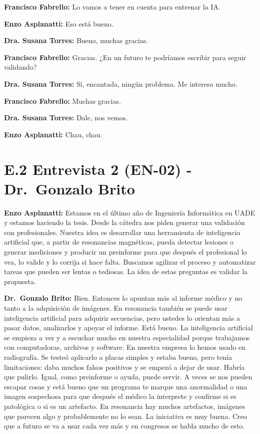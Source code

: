 \noindent\textbf{Francisco Fabrello:} Lo vamos a tener en cuenta para entrenar la IA.

\noindent\textbf{Enzo Asplanatti:} Eso está bueno.

\noindent\textbf{Dra. Susana Torres:} Bueno, muchas gracias.

\noindent\textbf{Francisco Fabrello:} Gracias. ¿En un futuro te podríamos escribir para seguir validando?

\noindent\textbf{Dra. Susana Torres:} Sí, encantada, ningún problema. Me interesa mucho.

\noindent\textbf{Francisco Fabrello:} Muchas gracias.

\noindent\textbf{Dra. Susana Torres:} Dale, nos vemos.

\noindent\textbf{Enzo Asplanatti:} Chau, chau.

\section*{E.2 Entrevista 2 (EN-02) - Dr.~Gonzalo Brito}
\label{anexo:entrevista-en02}

\noindent\textbf{Enzo Asplanatti:} Estamos en el último año de Ingeniería Informática en UADE y estamos haciendo la tesis. Desde la cátedra nos piden generar una validación con profesionales. Nuestra idea es desarrollar una herramienta de inteligencia artificial que, a partir de resonancias magnéticas, pueda detectar lesiones o generar mediciones y producir un preinforme para que después el profesional lo vea, lo valide y lo corrija si hace falta. Buscamos agilizar el proceso y automatizar tareas que pueden ser lentas o tediosas. La idea de estas preguntas es validar la propuesta.

\noindent\textbf{Dr.~Gonzalo Brito:} Bien. Entonces lo apuntan más al informe médico y no tanto a la adquisición de imágenes. En resonancia también se puede usar inteligencia artificial para adquirir secuencias, pero ustedes lo orientan más a pasar datos, analizarlos y apoyar el informe. Está bueno. La inteligencia artificial se empieza a ver y a escuchar mucho en nuestra especialidad porque trabajamos con computadoras, archivos y software. En nuestra empresa lo hemos usado en radiografía. Se testeó aplicarlo a placas simples y estaba bueno, pero tenía limitaciones: daba muchos falsos positivos y se empezó a dejar de usar. Habría que pulirlo. Igual, como preinforme o ayuda, puede servir. A veces se nos pueden escapar cosas y está bueno que un programa te marque una anormalidad o una imagen sospechosa para que después el médico la interprete y confirme si es patológica o si es un artefacto. En resonancia hay muchos artefactos, imágenes que parecen algo y probablemente no lo sean. La iniciativa es muy buena. Creo que a futuro se va a usar cada vez más y en congresos se habla mucho de esto.

